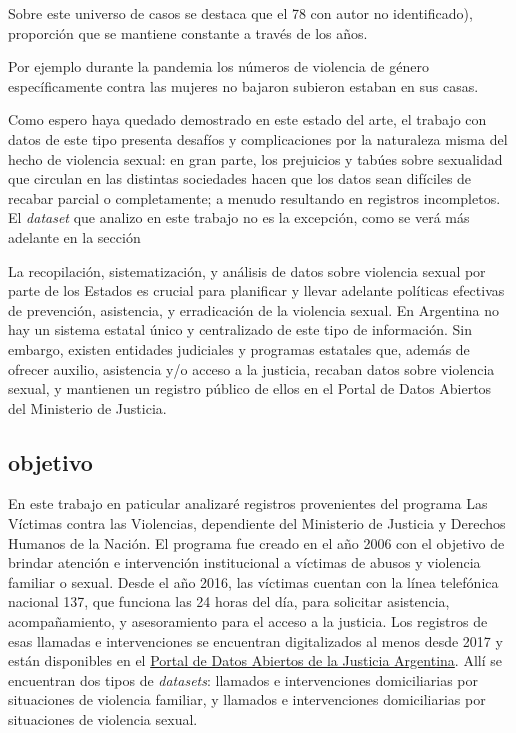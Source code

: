 \documentclass[10 pt]{article}
\begin{document}
Sobre este universo de casos se destaca que el 78%
con autor no identificado), proporción que se mantiene constante a través de los años. 

Por ejemplo durante la pandemia los números de violencia de género específicamente contra las mujeres no bajaron subieron estaban en sus casas.

Como espero haya quedado demostrado en este estado del arte, el trabajo con datos de este tipo presenta desafíos y complicaciones por la naturaleza misma del hecho de violencia sexual: en gran parte, los prejuicios y tabúes sobre sexualidad que circulan en las distintas sociedades hacen que los datos sean difíciles de recabar parcial o completamente; a menudo resultando en registros incompletos. El \textit{dataset} que analizo en este trabajo no es la excepción, como se verá más adelante en la sección 

La  recopilación, sistematización, y análisis de datos sobre violencia sexual por parte de los Estados es crucial para planificar y llevar adelante políticas efectivas de prevención, asistencia, y erradicación de la violencia sexual. En Argentina no hay un sistema estatal único y centralizado de este tipo de información. Sin embargo, existen entidades judiciales y programas estatales que, además de ofrecer auxilio, asistencia y/o acceso a la justicia, recaban datos sobre violencia sexual, y mantienen un registro público de ellos en el Portal de Datos Abiertos del Ministerio de Justicia.

\subsection*{objetivo}



En este trabajo en paticular analizaré registros provenientes del programa Las Víctimas contra las Violencias, dependiente del Ministerio de Justicia y Derechos Humanos de la Nación. El programa fue creado en el año 2006 con el objetivo de brindar atención e intervención institucional a víctimas de abusos y violencia familiar o sexual. Desde el año 2016, las víctimas cuentan con la línea telefónica nacional 137, que funciona las 24 horas del día, para solicitar asistencia, acompañamiento, y asesoramiento para el acceso a la justicia. Los registros de esas llamadas e intervenciones se encuentran digitalizados al menos desde 2017 y están disponibles en el \href{http://datos.jus.gob.ar/}{Portal de Datos Abiertos de la Justicia Argentina}. Allí se encuentran dos tipos de \textit{datasets}: llamados e intervenciones domiciliarias por situaciones de violencia familiar, y llamados e intervenciones domiciliarias por situaciones de violencia sexual. 
\end{document}
